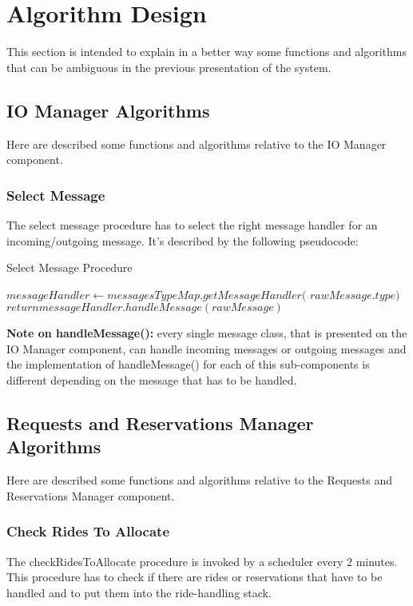 \documentclass[../../dd.tex]{subfiles}
\begin{document}
	\chapter{Algorithm Design}
		This section is intended to explain in a better way some functions and algorithms that can be ambiguous in the previous presentation of the system.

		\section{IO Manager Algorithms}
			Here are described some functions and algorithms relative to the IO Manager component.
			\subsection{Select Message}
				The select message procedure has to select the right message handler for an incoming/outgoing message.
				It's described by the following pseudocode:

				\begin{algorithm}
					\caption{Select Message Procedure}\label{alg:selectMessage}
					\begin{algorithmic}[1]
						\State $messageHandler\gets messagesTypeMap.getMessageHandler($
						\State $rawMessage.type)$
						\State $return messageHandler.handleMessage(rawMessage)$
					\EndProcedure
					\end{algorithmic}
				\end{algorithm}

				\textbf{Note on handleMessage():} every single message class, that is presented on the IO Manager component, can handle incoming messages or outgoing messages and the implementation of handleMessage() for each of this sub-components is different depending on the message that has to be handled.

		\section{Requests and Reservations Manager Algorithms}
			Here are described some functions and algorithms relative to the Requests and Reservations Manager component.

			\subsection{Check Rides To Allocate}
				The checkRidesToAllocate procedure is invoked by a scheduler every 2 minutes.
				This procedure has to check if there are rides or reservations that have to be handled and to put them into the ride-handling stack.
\end{document}
